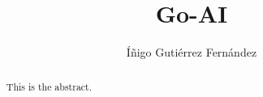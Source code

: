 \documentclass{article}
\newcommand{\program}{Go-AI}
\newcommand{\inputtex}[1]{}
\begin{document}
\frenchspacing

\title{\program}

\author{Íñigo Gutiérrez Fernández}

\date{}

\maketitle

\begin{abstract}
	This is the abstract.
\end{abstract}

\tableofcontents

\inputtex{introduction.tex}

\inputtex{previousWorks.tex}

\inputtex{interface.tex}

\inputtex{implementation.tex}

\printbibliography{}
\end{document}
